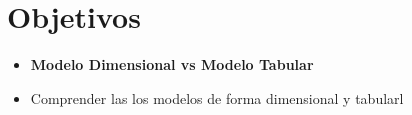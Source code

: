 \documentclass[twoside,twocolumn]{article}
\begin{document}
\section{Objetivos}

\begin{itemize}
\item 

\textbf{Modelo Dimensional vs Modelo Tabular}
\\
\item Comprender las los modelos de forma dimensional y tabularl



\end{itemize}


\end{document}

